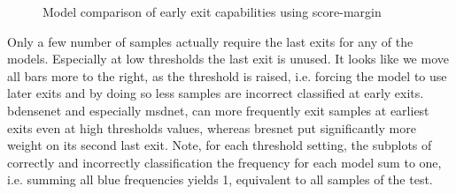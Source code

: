 \begin{minipage}{\linewidth}
\begin{figure}
		\hfill
		\hfill
		\hfill
		\hfill
		
		\caption[Model comparison of early exit capabilities]{Model comparison of early exit capabilities using score-margin}
		\label{fig:model_threshold_comparison}
	\end{figure}
	
\end{minipage}

Only a few number of samples actually require the last exits for any of the models. Especially at low thresholds the last exit is unused. It looks like we move all bars more to the right, as the threshold is raised, i.e. forcing the model to use later exits and by doing so less samples are incorrect classified at early exits. \gls{bdensenet} and especially \gls{msdnet}, can more frequently exit samples at earliest exits even at high thresholds values, whereas \gls{bresnet} put significantly more weight on its second last exit.
Note, for each threshold setting, the subplots of correctly and incorrectly classification the frequency for each model sum to one, i.e. summing all blue frequencies yields 1, equivalent to all samples of the test.

